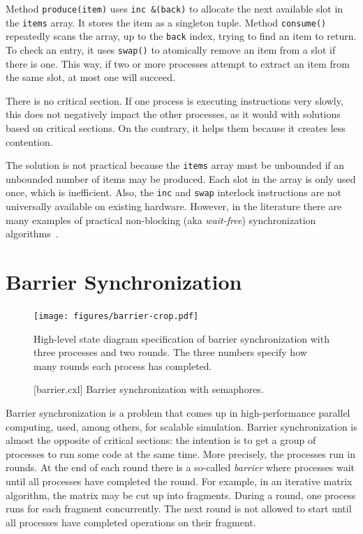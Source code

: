 \documentclass{report}
\newenvironment{code}{
\tcolorbox
}{
\endtcolorbox
}
\begin{document}
Method \texttt{produce(item)} uses \texttt{inc \&(back)} to allocate
the next available slot in the \texttt{items} array.
It stores the item as a singleton tuple.
Method \texttt{consume()} repeatedly scans the array, up to the
\texttt{back} index, trying to find an item to return.
To check an entry, it uses \texttt{swap()}
to atomically remove an item from a slot if there is one.
This way, if two or more processes attempt to extract an item from
the same slot, at most one will succeed.

There is no critical section.  If one process is executing instructions
very slowly, this does not negatively impact the other processes, as it
would with solutions based on critical sections.
On the contrary, it helps them because it creates less contention.

The solution is not practical because the \texttt{items} array must be
unbounded if an unbounded number of items may be produced.  Each slot
in the array is only used once, which is inefficient.  Also, the \texttt{inc}
and \texttt{swap} interlock instructions are not universally available
on existing hardware.
However, in the literature there are many examples of practical
non-blocking (aka \emph{wait-free}) synchronization algorithms~\cite{}.

\chapter{Barrier Synchronization}

\begin{figure}
\begin{center}
\texttt{[image: figures/barrier-crop.pdf]}
\end{center}
\caption{High-level state diagram specification of barrier synchronization
with three processes and two rounds.  The three numbers specify how many
rounds each process has completed.}
\label{fig:barrierdiagram}
\end{figure}

\begin{figure}
\begin{code}
\end{code}
\caption{[barrier.cxl] Barrier synchronization with semaphores.}
\label{fig:barrier}
\end{figure}

Barrier synchronization is a problem that comes up in high-performance
parallel computing, used, among others, for scalable simulation.
Barrier synchronization is almost the opposite of critical sections:
the intention is to get a group of processes to run some code at the
same time.
More precisely, the processes run in rounds.  At the end of each round
there is a so-called \emph{barrier} where processes wait until all
processes have completed the round.
For example, in an iterative matrix algorithm, the matrix may be
cut up into fragments.  During a round, one process runs for each
fragment concurrently.  The next round is not allowed to start
until all processes have completed operations on their fragment.
\end{document}
